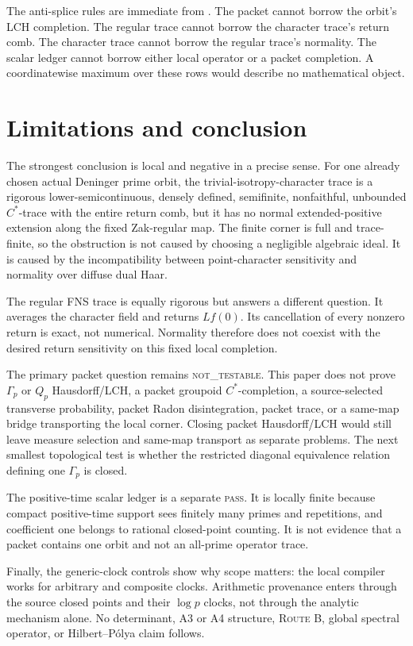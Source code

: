 \documentclass[11pt]{article}
\theoremstyle{definition}
\newcommand{\NOTTESTABLE}{\textsc{not\_testable}}
\newcommand{\PASS}{\textsc{pass}}
\begin{document}
The anti-splice rules are immediate from .  The packet cannot borrow the orbit's LCH completion.  The regular trace cannot borrow the character trace's return comb.  The character trace cannot borrow the regular trace's normality.  The scalar ledger cannot borrow either local operator or a packet completion.  A coordinatewise maximum over these rows would describe no mathematical object.

\section{Limitations and conclusion}

The strongest conclusion is local and negative in a precise sense.  For one already chosen actual Deninger prime orbit, the trivial-isotropy-character trace is a rigorous lower-semicontinuous, densely defined, semifinite, nonfaithful, unbounded \(C^*\)-trace with the entire return comb, but it has no normal extended-positive extension along the fixed Zak-regular map.  The finite corner is full and trace-finite, so the obstruction is not caused by choosing a negligible algebraic ideal.  It is caused by the incompatibility between point-character sensitivity and normality over diffuse dual Haar.

The regular FNS trace is equally rigorous but answers a different question.  It averages the character field and returns \(Lf(0)\).  Its cancellation of every nonzero return is exact, not numerical.  Normality therefore does not coexist with the desired return sensitivity on this fixed local completion.

The primary packet question remains \NOTTESTABLE.  This paper does not prove \(\Gamma_p\) or \(Q_p\) Hausdorff/LCH, a packet groupoid \(C^*\)-completion, a source-selected transverse probability, packet Radon disintegration, packet trace, or a same-map bridge transporting the local corner.  Closing packet Hausdorff/LCH would still leave measure selection and same-map transport as separate problems.  The next smallest topological test is whether the restricted diagonal equivalence relation defining one \(\Gamma_p\) is closed.

The positive-time scalar ledger is a separate \PASS.  It is locally finite because compact positive-time support sees finitely many primes and repetitions, and coefficient one belongs to rational closed-point counting.  It is not evidence that a packet contains one orbit and not an all-prime operator trace.

Finally, the generic-clock controls show why scope matters: the local compiler works for arbitrary and composite clocks.  Arithmetic provenance enters through the source closed points and their \(\log p\) clocks, not through the analytic mechanism alone.  No determinant, A3 or A4 structure, \textsc{Route B}, global spectral operator, or Hilbert--Pólya claim follows.
\end{document}
